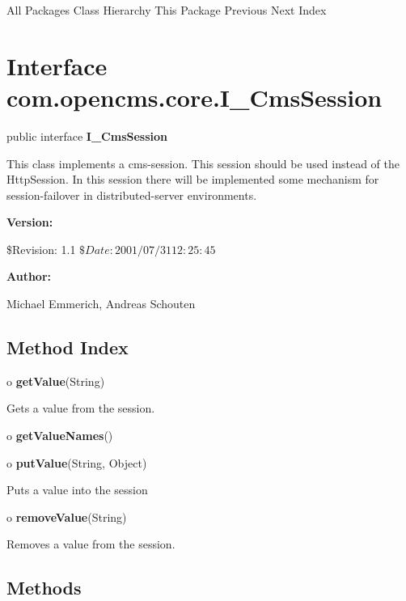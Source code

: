\begin{PRE}
All Packages  Class Hierarchy  This Package  Previous  Next  Index
\end{PRE}

\htmlHR

\section{  Interface com.opencms.core.I\_CmsSession }

\begin{description}
\item public interface {\bf I\_CmsSession} 
\end{description}

This class implements a cms-session. This session should be used instead of
the HttpSession. In this session there will be implemented some mechanism for
session-failover in distributed-server environments. 

\begin{description}
\item {\bf Version:}  

\$Revision: 1.1 $ \$Date: 2001/07/31 12:25:45 $  
\item {\bf Author:}  

Michael Emmerich, Andreas Schouten 
\end{description}

\htmlHR

\subsection*{  Method Index }

\begin{description}
\item o {\bf getValue}(String)  

Gets a value from the session.  
\item o {\bf getValueNames}()  

\item o {\bf putValue}(String, Object)  

Puts a value into the session  
\item o {\bf removeValue}(String)  

Removes a value from the session. 
\end{description}

\subsection*{  Methods }

